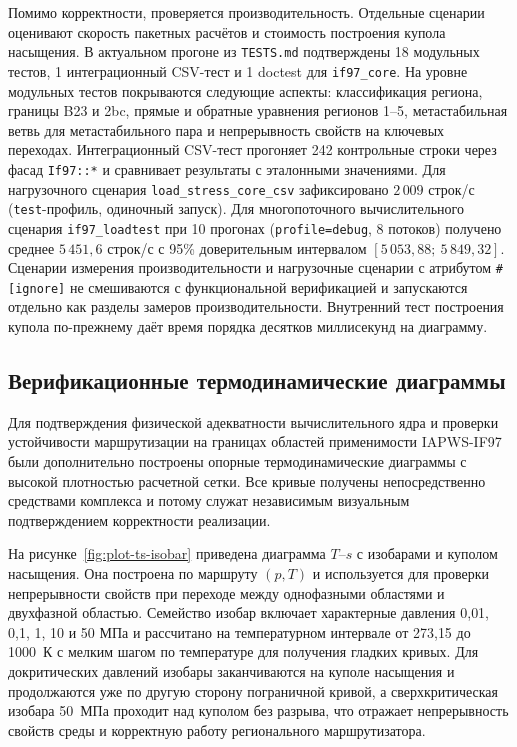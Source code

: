 Помимо корректности, проверяется производительность.
Отдельные сценарии оценивают
скорость пакетных расчётов и стоимость построения купола насыщения.
В актуальном прогоне из \texttt{TESTS.md}
подтверждены 18 модульных тестов,
1 интеграционный CSV-тест
и 1 doctest для \texttt{if97\_core}.
На уровне модульных тестов покрываются следующие аспекты:
классификация региона,
границы B23 и 2bc,
прямые и обратные уравнения регионов 1--5,
метастабильная ветвь для метастабильного пара
и непрерывность свойств на ключевых переходах.
Интеграционный CSV-тест
прогоняет 242 контрольные строки
через фасад \texttt{If97::*}
и сравнивает результаты с эталонными значениями.
Для нагрузочного сценария \texttt{load\_stress\_core\_csv}
зафиксировано $2\,009$ строк/с
(\texttt{test}-профиль, одиночный запуск).
Для многопоточного вычислительного сценария \texttt{if97\_loadtest}
при 10 прогонах (\texttt{profile=debug}, 8 потоков)
получено среднее $5\,451{,}6$ строк/с
с 95\% доверительным интервалом $[5\,053{,}88;\ 5\,849{,}32]$.
Сценарии измерения производительности и нагрузочные сценарии с атрибутом \texttt{\#[ignore]}
не смешиваются с функциональной верификацией
и запускаются отдельно как разделы замеров производительности.
Внутренний тест построения купола
по-прежнему даёт время порядка десятков миллисекунд на диаграмму.

\subsection{Верификационные термодинамические диаграммы}

Для подтверждения физической адекватности вычислительного ядра
и проверки устойчивости маршрутизации на границах областей применимости
IAPWS-IF97 были дополнительно построены опорные термодинамические диаграммы
с высокой плотностью расчетной сетки.
Все кривые получены непосредственно средствами комплекса
и потому служат независимым визуальным подтверждением корректности реализации.

На рисунке~\ref{fig:plot-ts-isobar} приведена диаграмма $T$--$s$ с изобарами и куполом насыщения.
Она построена по маршруту $(p, T)$ и используется для проверки непрерывности свойств
при переходе между однофазными областями и двухфазной областью.
Семейство изобар включает характерные давления 0{,}01, 0{,}1, 1, 10 и 50 МПа
и рассчитано на температурном интервале от 273{,}15 до 1000~К
с мелким шагом по температуре для получения гладких кривых.
Для докритических давлений изобары заканчиваются на куполе насыщения
и продолжаются уже по другую сторону пограничной кривой,
а сверхкритическая изобара 50~МПа проходит над куполом без разрыва,
что отражает непрерывность свойств среды и корректную работу регионального маршрутизатора.

